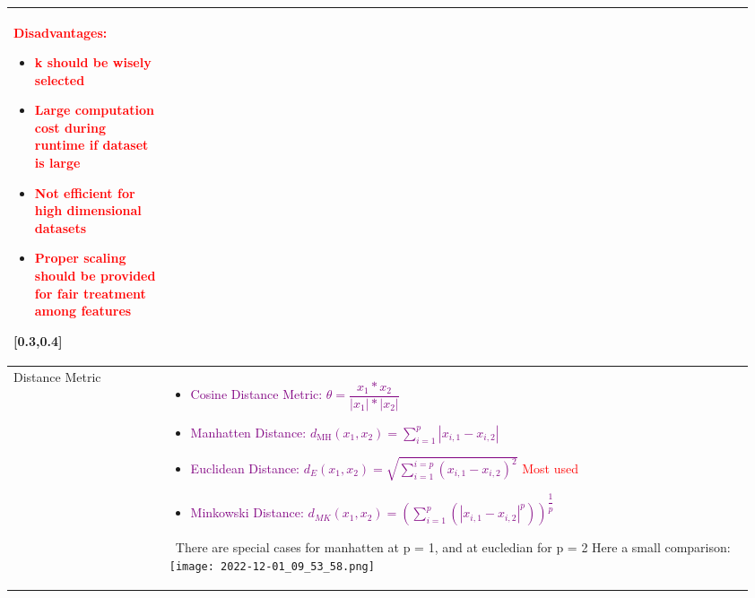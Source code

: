 \documentclass[main.tex,fontsize=8pt,paper=a4,paper=portrait,DIV=calc,]{scrartcl}
\begin{document}
\begin{table}[ht!]
\begin{tabular}{|m{0.2\linewidth}|m{0.755\linewidth}|}
{}{
\textcolor{red}{Disadvantages:}\newline
\begin{itemize}
\item \textcolor{red}{k should be wisely selected}
\item \textcolor{red}{Large computation cost during runtime if dataset is large}
\item \textcolor{red}{Not efficient for high dimensional datasets}
\item \textcolor{red}{Proper scaling should be provided for fair treatment among features}
\end{itemize} 
}[0.3,0.4]
\\ 
\hline
Distance Metric &
\vspace{2mm}
\large
\begin{itemize}
  \item \textcolor{purple}{Cosine Distance Metric: \( \theta = \dfrac{x_1 * x_2}{|x_1| * |x_2|} \)}\newline
    \, \newline
  \item \textcolor{purple}{Manhatten Distance: \( d_\text{MH}(x_1,x_2)= \sum_{i=1}^{p} | x_{i,1} - x_{i,2} | \)}\newline
    \, \newline
  \item \textcolor{purple}{Euclidean Distance: \( d_E(x_1,x_2) = \sqrt{\sum_{i=1}^{i=p}(x_{i,1} - x_{i,2})^2} \)}\newline
    \textcolor{red}{Most used}
  \item \textcolor{purple}{Minkowski Distance: \( d_{MK}(x_1,x_2) = (\sum_{i=1}^{p}(|x_{i,1} - x_{i,2}|^p))^{\dfrac{1}{p}} \)}
\vspace{-3mm}
\end{itemize} 
\normalsize \, \newline
There are special cases for manhatten at p = 1, and at eucledian for p = 2\newline
Here a small comparison: \newline
\texttt{[image: 2022-12-01\_09\_53\_58.png]}\\
\hline
\end{tabular}
\end{table}
\pagebreak
\end{document}
